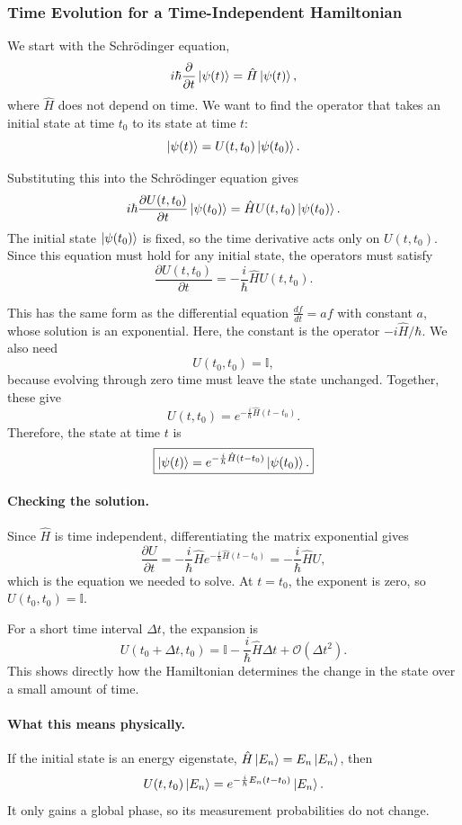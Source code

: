 \documentclass[11pt]{article}
\begin{document}
\setcounter{subsubsection}{1}
\subsubsection{Time Evolution for a Time-Independent Hamiltonian}

We start with the Schr\"odinger equation,
\[
i\hbar\frac{\partial}{\partial t}\ket{\psi(t)}
=
\hat{H}\ket{\psi(t)},
\]
where $\hat{H}$ does not depend on time. We want to find
the operator that takes an initial state at time $t_0$
to its state at time $t$:
\[
\ket{\psi(t)}=U(t,t_0)\ket{\psi(t_0)}.
\]

Substituting this into the Schr\"odinger equation gives
\[
i\hbar\frac{\partial U(t,t_0)}{\partial t}
\ket{\psi(t_0)}
=
\hat{H}U(t,t_0)\ket{\psi(t_0)}.
\]
The initial state $\ket{\psi(t_0)}$ is fixed, so the
time derivative acts only on $U(t,t_0)$. Since this
equation must hold for any initial state, the operators
must satisfy
\[
\frac{\partial U(t,t_0)}{\partial t}
=
-\frac{i}{\hbar}\hat{H}U(t,t_0).
\]

This has the same form as the differential equation
$\frac{df}{dt}=af$ with constant $a$, whose solution
is an exponential. Here, the constant is the operator
$-i\hat{H}/\hbar$. We also need
\[
U(t_0,t_0)=\mathbb{I},
\]
because evolving through zero time must leave the
state unchanged. Together, these give
\[
\boxed{
U(t,t_0)=
e^{-\frac{i}{\hbar}\hat{H}(t-t_0)}.
}
\]
Therefore, the state at time $t$ is
\[
\boxed{
\ket{\psi(t)}
=
e^{-\frac{i}{\hbar}\hat{H}(t-t_0)}
\ket{\psi(t_0)}.
}
\]

\paragraph{Checking the solution.}
Since $\hat{H}$ is time independent, differentiating
the matrix exponential gives
\[
\frac{\partial U}{\partial t}
=
-\frac{i}{\hbar}\hat{H}
e^{-\frac{i}{\hbar}\hat{H}(t-t_0)}
=
-\frac{i}{\hbar}\hat{H}U,
\]
which is the equation we needed to solve. At $t=t_0$,
the exponent is zero, so $U(t_0,t_0)=\mathbb{I}$.

For a short time interval $\Delta t$, the expansion is
\[
U(t_0+\Delta t,t_0)
=
\mathbb{I}
-\frac{i}{\hbar}\hat{H}\Delta t
+\mathcal{O}(\Delta t^2).
\]
This shows directly how the Hamiltonian determines
the change in the state over a small amount of time.

\paragraph{What this means physically.}
If the initial state is an energy eigenstate,
$\hat{H}\ket{E_n}=E_n\ket{E_n}$, then
\[
U(t,t_0)\ket{E_n}
=
e^{-\frac{i}{\hbar}E_n(t-t_0)}\ket{E_n}.
\]
It only gains a global phase, so its measurement
probabilities do not change.
\end{document}
